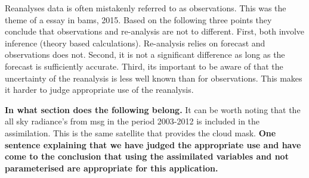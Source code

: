 Reanalyses data is often mistakenly referred to as observations. This was the theme of a essay in \acrfull{bams}, 2015. Based on the following three points they conclude that observations and re-analysis are not to different. First, both involve inference (theory based calculations). Re-analysis relies on forecast and observations does not. Second, it is not a significant difference as long as the forecast is sufficiently accurate. Third, its important to be aware of that the uncertainty of the reanalysis is less well known than for observations. This makes it harder to judge appropriate use of the reanalysis. 

\textbf{In what section does the following belong.}
It can be worth noting that the all sky radiance's from \acrfull{msg} in the period 2003-2012 is included in the assimilation. This is the same satellite that provides the cloud mask. 
\textbf{One sentence explaining that we have judged the appropriate use and have come to the conclusion that using the assimilated variables and not parameterised are appropriate for this application.}

